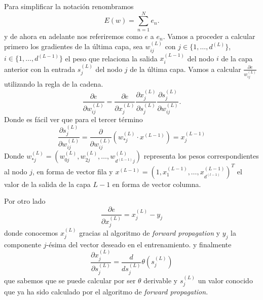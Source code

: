 Para simplificar la notación renombramos 
\begin{equation}
    E(w) = \sum^{N}_{n=1} e_n.
\end{equation}
y de ahora en adelante nos referiremos como $e$ a $e_n.$
Vamos a proceder a calcular primero los gradientes de la última capa, 
sea $w^{(L)}_{i j}$  con $j \in \{1, \ldots , d^{(L)}\}$, 
$i \in \{1, \ldots , d^{(L-1)}\}$  el peso que relaciona la salida 
$x_i ^{(L-1)}$ del  
nodo $i$ de la capa anterior con la entrada $s_j ^{(L)}$ del nodo $j$ de la última capa. 
Vamos a calcular $\frac{\partial e}{ w^{(L)}_{i j}}$ utilizando la regla de la cadena. 
\begin{equation}
    \frac{\partial{e}}{\partial w^{(L)}_{i j}}
     = 
     \frac{\partial{e}}{\partial x^{(L)}_j} 
     \frac{\partial x^{(L)}_j}{\partial s^{(L)}_j} 
     \frac{\partial s^{(L)}_j}{\partial w^{(L)}_{i j}}.
\end{equation}
Donde es fácil ver que para el tercer término
\begin{equation}\label{eq:backpropagation_s_última_capa_derivada}
    \frac{\partial s^{(L)}_{j}}{\partial w^{(L)}_{i j}}
    = 
    \frac{\partial }{\partial w^{(L)}_{i j}}
    \left(
        w^{(L)}_{\ast j } \cdot x^{(L-1)}
    \right)
    = 
    x^{(L-1)}_j
\end{equation}
Donde $w^{(L)}_{\ast j} = \left(w^{(L)}_{0 j}, w^{(L)}_{2 j}, \ldots, w^{(L)}_{d^{(L-1)} j}\right)$ representa los pesos correspondientes al nodo $j$,
 en forma de  vector fila y $x^{(L-1)} = \left(1, x ^{(L-1)}_1, \ldots, x ^{(L-1)}_{d^{(l-1)}}\right)^T$ el valor de la salida de la capa $L-1$
 en forma de vector columna.
 
 Por otro lado 
 \begin{equation}\label{eq:backpropagation_E_última_capa_derivada}
    \frac{\partial{e}}{\partial x^{(L)}_j} =
    x^{(L)}_j - y_j
 \end{equation}
 donde conocemos $x^{(L)}_j$ gracias al algoritmo de \textit{forward propagation}
 y $y_j$ la componente $j$-ésima del vector deseado en el entrenamiento.
y finalmente
\begin{equation}\label{eq:backpropagation_x_última_capa_derivada}
    \frac{\partial x^{(L)}_j}{\partial s^{(L)}_j} 
    = 
    \frac{d}{d s^{(L)}_j} 
        \theta \left( 
            s^{(L)}_j
        \right)
\end{equation}
que sabemos que se puede calcular por ser $\theta$ derivable y 
$s^{(L)}_j$ un valor conocido que ya ha sido calculado por el algoritmo de 
\textit{forward propagation.}

